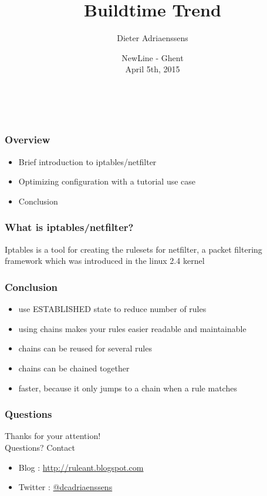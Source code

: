 \documentclass[14pt]{beamer}
\title[Buildtime Trend]{Buildtime Trend}
\author{Dieter Adriaenssens}
\institute[Buildtime Trend]{@dcadriaenssens - Buildtime Trend}
\date[NewLine 5Apr2015]{NewLine - Ghent\\
April 5th, 2015}
\begin{document}
  \begin{frame}
  \titlepage
  \vfill
    \begin{center}
      \\[2.5ex]
        {\tiny\CcNote{\CcLongnameByNcSa}}
        \vspace*{-2.5ex}
    \end{center}
  \end{frame}
  \begin{frame}
    \frametitle{Overview}
    \begin{itemize}
      \item Brief introduction to iptables/netfilter
      \item Optimizing configuration with a tutorial use case
      \item Conclusion
    \end{itemize}
  \end{frame}
  \begin{frame}
    \frametitle{What is iptables/netfilter?}
    Iptables is a tool for creating the rulesets for netfilter, a packet filtering framework which was introduced in the linux 2.4 kernel
  \end{frame}

  \begin{frame}
    \frametitle{Conclusion}
    \begin{itemize}
      \item use ESTABLISHED state to reduce number of rules
      \item using chains makes your rules easier readable and maintainable
      \item chains can be reused for several rules
      \item chains can be chained together
      \item faster, because it only jumps to a chain when a rule matches
    \end{itemize}
  \end{frame}
  \begin{frame}
   \frametitle{Questions}
    Thanks for your attention!\\
    Questions?
    \vfill
    Contact
    \begin{itemize}
      \item Blog : \href{http://ruleant.blogspot.com/}{http://ruleant.blogspot.com}
      \item Twitter : \href{https://twitter.com/dcadriaenssens}{@dcadriaenssens}
    \end{itemize}
  \end{frame}
\end{document}
